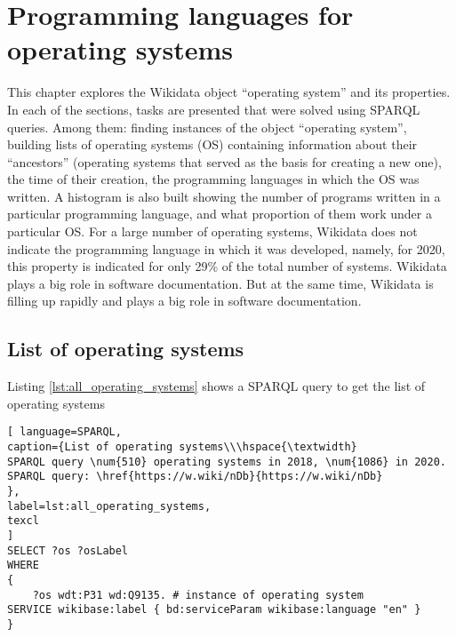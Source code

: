 \setchapterpreamble[u]{\margintoc}
\chapter[Programming languages for operating systems]{Programming languages for operating systems\protect\footnotemark}


This chapter explores the Wikidata object ``operating system'' and its properties. In each of the sections, tasks are presented that were solved using SPARQL queries. Among them: finding instances of the object ``operating system'', building lists of operating systems (OS) containing information about their ``ancestors'' (operating systems that served as the basis for creating a new one), the time of their creation, the programming languages in which the OS was written.
A histogram is also built showing the number of programs written in a particular programming language, and what proportion of them work under a particular OS. 
For a large number of operating systems, Wikidata does not indicate the programming language in which it was developed, namely, for 2020, this property is indicated for only 29\% of the total number of systems.
Wikidata plays a big role in software documentation. But at the same time, Wikidata is filling up rapidly and plays a big role in software documentation.

\section{List of operating systems}

Listing \ref{lst:all_operating_systems} shows a SPARQL query to get the list of operating systems

\begin{lstlisting}[ language=SPARQL, 
caption={List of operating systems\\\hspace{\textwidth} 
SPARQL query \num{510} operating systems in 2018, \num{1086} in 2020.
SPARQL query: \href{https://w.wiki/nDb}{https://w.wiki/nDb}
},
label=lst:all_operating_systems,
texcl 
]
SELECT ?os ?osLabel
WHERE
{
	?os wdt:P31 wd:Q9135. # instance of operating system
SERVICE wikibase:label { bd:serviceParam wikibase:language "en" }
}
\end{lstlisting}

